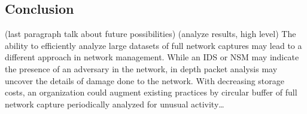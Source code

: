 \documentclass{article}
\begin{document}
\begin{multicols}{2}
\section{Conclusion}

(last paragraph talk about future possibilities)
(analyze results, high level)
The ability to efficiently analyze large datasets of full network captures may lead to a different approach in network management.  While an IDS or NSM may indicate the presence of an adversary in the network, in depth packet analysis may uncover the details of damage done to the network.  With decreasing storage costs, an organization could augment existing practices by circular buffer of full network capture periodically analyzed for unusual activity…

\end{multicols}
\end{document}
